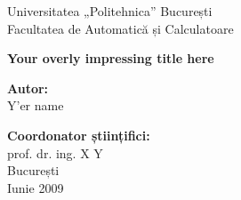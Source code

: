 \thispagestyle{empty}
\begin{center}
\large
Universitatea „Politehnica” București \\
Facultatea de Automatică și Calculatoare \\

{\LARGE
	\textbf{Your overly impressing title here}
}

\vspace{3cm}
\textbf{Autor:}\\
Y'er name

\bigskip
\bigskip

\textbf{Coordonator științifici:}\\
prof. dr. ing. X Y\\

București\\
Iunie 2009 \\
\vspace*{1cm}
\end{center}
